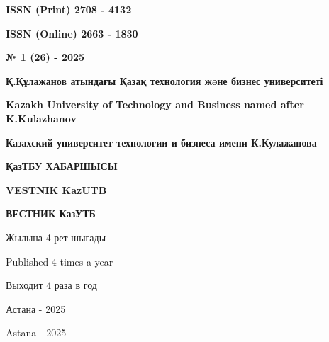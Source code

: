 \begin{flushright}
\textbf{ISSN (Print) 2708 - 4132}

\textbf{ISSN (Online) 2663 - 1830}

\vspace{1cm}

\textbf{№ 1 (26) - 2025}
\end{flushright}

\vfill

\begin{center}
\textbf{\large Қ.Құлажанов атындағы Қазақ технология жəне бизнес университеті}

\vspace{0.3cm}

\textbf{\large Kazakh University of Technology and Business named after K.Kulazhanov}

\vspace{0.3cm}

\textbf{\large Казахский университет технологии и бизнеса имени К.Кулажанова}

\vfill

\textbf{\huge ҚазТБУ ХАБАРШЫСЫ}

\vspace{0.5cm}

\textbf{\huge VESTNIK KazUTB}

\vspace{0.5cm}

\textbf{\huge ВЕСТНИК КазУТБ}

\vfill

Жылына 4 рет шығады

Published 4 times a year

Выходит 4 раза в год

\vfill

Астана - 2025

Astana - 2025
\end{center}

